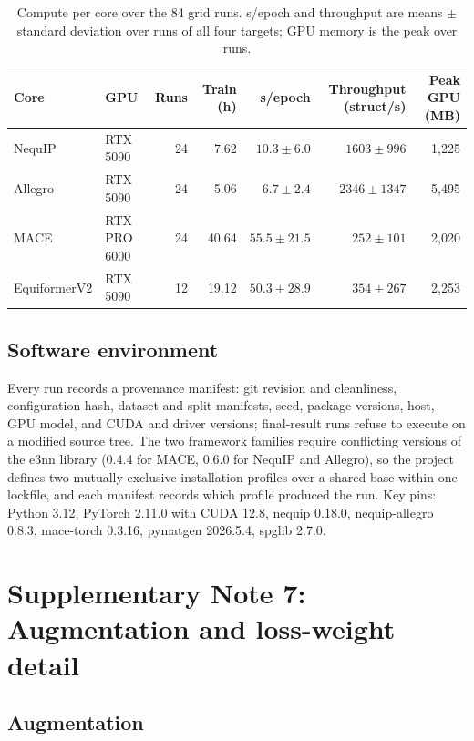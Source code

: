 \begin{table}[htbp]
\centering
\small
\caption{Compute per core over the 84 grid runs. s/epoch and throughput are means $\pm$ standard deviation over runs of all four targets; GPU memory is the peak over runs.}
\label{stab:compute}
\begin{tabular}{llrrrrr}
\toprule
Core & GPU & Runs & Train (h) & s/epoch & Throughput (struct/s) & Peak GPU (MB) \\
\midrule
NequIP & RTX 5090 & 24 & 7.62 & $10.3 \pm 6.0$ & $1603 \pm 996$ & 1{,}225 \\
Allegro & RTX 5090 & 24 & 5.06 & $6.7 \pm 2.4$ & $2346 \pm 1347$ & 5{,}495 \\
MACE & RTX PRO 6000 & 24 & 40.64 & $55.5 \pm 21.5$ & $252 \pm 101$ & 2{,}020 \\
EquiformerV2 & RTX 5090 & 12 & 19.12 & $50.3 \pm 28.9$ & $354 \pm 267$ & 2{,}253 \\
\bottomrule
\end{tabular}
\end{table}

\subsection*{Software environment}

Every run records a provenance manifest: git revision and cleanliness, configuration hash, dataset and split manifests, seed, package versions, host, GPU model, and CUDA and driver versions; final-result runs refuse to execute on a modified source tree. The two framework families require conflicting versions of the e3nn library\cite{geiger2022e3nn} (0.4.4 for MACE, 0.6.0 for NequIP and Allegro), so the project defines two mutually exclusive installation profiles over a shared base within one lockfile, and each manifest records which profile produced the run. Key pins: Python 3.12, PyTorch\cite{paszke2019pytorch} 2.11.0 with CUDA 12.8, nequip 0.18.0, nequip-allegro 0.8.3, mace-torch 0.3.16, pymatgen 2026.5.4, spglib 2.7.0.

\section*{Supplementary Note 7: Augmentation and loss-weight detail}

\subsection*{Augmentation}

